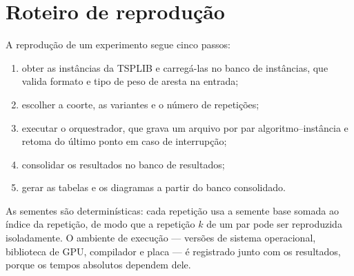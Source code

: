 \section{Roteiro de reprodução}\label{apendice-reproducao}

A reprodução de um experimento segue cinco passos:

\begin{enumerate}
  \def\labelenumi{\arabic{enumi}.}
  \tightlist
  \item
        obter as instâncias da TSPLIB e carregá-las no banco de instâncias, que valida formato e tipo de peso de aresta na entrada;
  \item
        escolher a coorte, as variantes e o número de repetições;
  \item
        executar o orquestrador, que grava um arquivo por par algoritmo--instância e retoma do último ponto em caso de interrupção;
  \item
        consolidar os resultados no banco de resultados;
  \item
        gerar as tabelas e os diagramas a partir do banco consolidado.
\end{enumerate}

As sementes são determinísticas: cada repetição usa a semente base somada ao índice da repetição, de modo que a repetição \(k\) de um par pode ser reproduzida isoladamente.
O ambiente de execução --- versões de sistema operacional, biblioteca de GPU, compilador e placa --- é registrado junto com os resultados, porque os tempos absolutos dependem dele.
